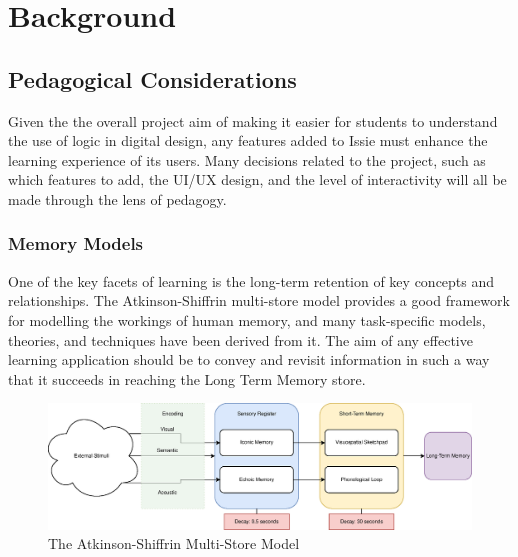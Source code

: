 \chapter{Background} \label{chap:background}

\section{Pedagogical Considerations} \label{sec:ped_cons}
Given  the the overall project aim of making it easier for students to understand the use of logic in digital design, any features added to Issie must enhance the learning experience of its users. Many decisions related to the project, such as which features to add, the UI/UX design, and the level of interactivity will all be made through the lens of pedagogy.
\subsection{Memory Models}
One of the key facets of learning is the long-term retention of key concepts and relationships. The Atkinson-Shiffrin multi-store model \cite{memory_model} provides a good framework for modelling the workings of human memory, and many task-specific models, theories, and techniques have been derived from it. The aim of any effective learning application should be to convey and revisit information in such a way that it succeeds in reaching the Long Term Memory store.

\begin{figure} [h]
    \centering
    \includegraphics[width=\textwidth]{02.Background/atkinson.eps}
    \caption{The Atkinson-Shiffrin Multi-Store Model}
    \label{fig:atkinson}
\end{figure}

